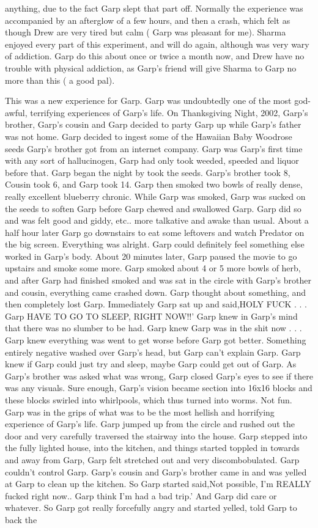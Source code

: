 \documentclass[12pt]{book}
\begin{document}
anything, due to the fact Garp slept that part off. Normally the experience was accompanied by an afterglow of a few hours, and then a crash, which felt as though Drew are very tired but calm ( Garp was pleasant for me). Sharma enjoyed every part of this experiment, and will do again, although was very wary of addiction. Garp do this about once or twice a month now, and Drew have no trouble with physical addiction, as Garp's friend will give Sharma to Garp no more than this ( a good pal).



This was a new experience for Garp. Garp was undoubtedly one of the most god-awful, terrifying experiences of Garp's life. On Thanksgiving Night, 2002, Garp's brother, Garp's cousin and Garp decided to party Garp up while Garp's father was not home. Garp decided to ingest some of the Hawaiian Baby Woodrose seeds Garp's brother got from an internet company. Garp was Garp's first time with any sort of hallucinogen, Garp had only took weeded, speeded and liquor before that. Garp began the night by took the seeds. Garp's brother took 8, Cousin took 6, and Garp took 14. Garp then smoked two bowls of really dense, really excellent blueberry chronic. While Garp was smoked, Garp was sucked on the seeds to soften Garp before Garp chewed and swallowed Garp. Garp did so and was felt good and giddy, etc.. more talkative and awake than usual. About a half hour later Garp go downstairs to eat some leftovers and watch Predator on the big screen. Everything was alright. Garp could definitely feel something else worked in Garp's body. About 20 minutes later, Garp paused the movie to go upstairs and smoke some more. Garp smoked about 4 or 5 more bowls of herb, and after Garp had finished smoked and was sat in the circle with Garp's brother and cousin, everything came crashed down. Garp thought about something, and then completely lost Garp. Immediately Garp sat up and said,HOLY FUCK . . .  Garp HAVE TO GO TO SLEEP, RIGHT NOW!!' Garp knew in Garp's mind that there was no slumber to be had. Garp knew Garp was in the shit now . . .  Garp knew everything was went to get worse before Garp got better. Something entirely negative washed over Garp's head, but Garp can't explain Garp. Garp knew if Garp could just try and sleep, maybe Garp could get out of Garp. As Garp's brother was asked what was wrong, Garp closed Garp's eyes to see if there was any visuals. Sure enough, Garp's vision became section into 16x16 blocks and these blocks swirled into whirlpools, which thus turned into worms. Not fun. Garp was in the grips of what was to be the most hellish and horrifying experience of Garp's life. Garp jumped up from the circle and rushed out the door and very carefully traversed the stairway into the house. Garp stepped into the fully lighted house, into the kitchen, and things started toppled in towards and away from Garp, Garp felt stretched out and very discombobulated. Garp couldn't control Garp. Garp's cousin and Garp's brother came in and was yelled at Garp to clean up the kitchen. So Garp started said,Not possible, I'm REALLY fucked right now.. Garp think I'm had a bad trip.' And Garp did care or whatever. So Garp got really forcefully angry and started yelled, told Garp to back the 
\end{document}
